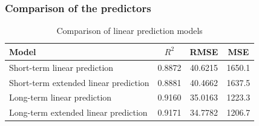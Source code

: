         \subsubsection{Comparison of the predictors} \label{subsec:res_comparison}
        \begin{table}[!ht]
            \centering
            \begin{tabular}{|l|c|c|c|}
                \hline
                Model & $R^2$ & RMSE & MSE \\
                \hline
                Short-term linear prediction & 0.8872 & 40.6215 & 1650.1 \\
                Short-term extended linear prediction & 0.8881 & 40.4662 & 1637.5 \\
                Long-term linear prediction & 0.9160 & 35.0163 & 1223.3 \\
                Long-term extended linear prediction & 0.9171 & 34.7782 & 1206.7 \\
                \hline
            \end{tabular}
            \caption{Comparison of linear prediction models}
            \label{tab:model_comparison}
        \end{table}

